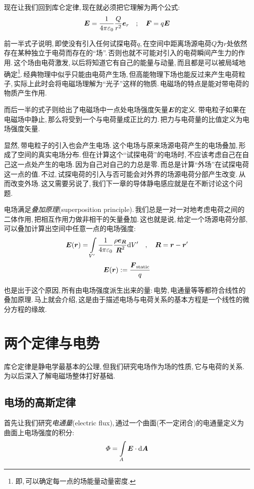现在让我们回到库仑定律,\,现在就必须把它理解为两个公式:
\[\boldsymbol{E}=\frac{1}{4\pi\varepsilon_0} \frac{Q}{r^2}\boldsymbol{e}_r\quad ;\quad \boldsymbol{F}=q\boldsymbol{E}\]

前一半式子说明,\,即使没有引入任何试探电荷$q$,\,在空间中距离场源电荷$Q$为$r$处依然存在某种独立于电荷而存在的``场''.\,否则也就不可能对引入的电荷瞬间产生力的作用.\,这个场由电荷激发,\,以后将知道它有自己的能量与动量,\,而且都是可以被局域地确定\footnote{即,\,可以确定每一点的场能量动量密度.}.\,经典物理中似乎只能由电荷产生场,\,但高能物理下场也能反过来产生电荷粒子,\,实际上此时会将电磁场理解为``光子''这样的物质.\,电磁场的特点是能对带电荷的物质产生作用.

而后一半的式子则给出了电磁场中一点处电场强度矢量$\boldsymbol{E}$的定义.\,带电粒子如果在电磁场中静止,\,那么将受到一个与电荷量成正比的力.\,把力与电荷量的比值定义为电场强度矢量.

显然,\,带电粒子的引入也会产生电场.\,这个电场与原来场源电荷产生的电场叠加,\,形成了空间的真实电场分布.\,但在计算这个``试探电荷''的电场时,\,不应该考虑自己在自己这一点处产生的电场.\,因为自己对自己的力总是零.\,而总是计算``外场''在试探电荷这一点的值.\,不过,\,试探电荷的引入与否可能会对外界的场源电荷分部产生改变.\,从而改变外场.\,这又需要另说了,\,我们下一章的导体静电感应就是在不断讨论这个问题.

电场满足\emph{叠加原理}(superposition principle).\,我们总是一对一对地考虑电荷之间的二体作用,\,把相互作用力做非相干的矢量叠加.\,这也就是说,\,给定一个场源电荷分部,\,可以叠加计算出空间中任意一点的电场强度:
\[\boldsymbol{E}(\boldsymbol{r})=\int\limits_{V'} \frac{1}{4\pi\varepsilon_0} \frac{\rho \boldsymbol{e}_{\boldsymbol{R}}}{\boldsymbol{R}^2} \textrm{d} V'\quad,\quad \boldsymbol{R}=\boldsymbol{r}-\boldsymbol{r}'\]
\[\boldsymbol{E}(\boldsymbol{r}):=\frac{\boldsymbol{F}_{\rm static}}{q}\]

也是出于这个原因,\,所有由电场强度派生出来的量:\,电势,\,电通量等等都符合线性的叠加原理.\,马上就会介绍,\,这是由于描述电场与电荷关系的基本方程是一个线性的微分方程的缘故.




\section{两个定律与电势}

库仑定律是静电学最基本的公理,\,但我们研究电场作为场的性质,\,它与电荷的关系.\,为以后深入了解电磁场整体打好基础.

\subsection{电场的高斯定律}

首先让我们研究\emph{电通量}(electric flux),\,通过一个曲面(不一定闭合)的电通量定义为曲面上电场强度的积分:
\[\varPhi=\int\limits_A \boldsymbol{E}\cdot\textrm{d} \boldsymbol{A}\]

